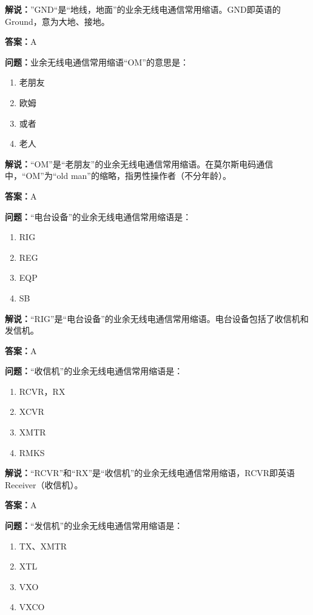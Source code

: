 \textbf{解说：}”GND“是“地线，地面”的业余无线电通信常用缩语。GND即英语的Ground，意为大地、接地。

\textbf{答案：}A

\textbf{问题：}业余无线电通信常用缩语“OM”的意思是：

\begin{enumerate}[label=\Alph*), leftmargin=3em]
	\item 老朋友
	\item 欧姆
	\item 或者
	\item 老人
\end{enumerate}

\textbf{解说：}“OM”是“老朋友”的业余无线电通信常用缩语。在莫尔斯电码通信中，“OM”为“old man”的缩略，指男性操作者（不分年龄）。

\textbf{答案：}A

\textbf{问题：}“电台设备”的业余无线电通信常用缩语是：

\begin{enumerate}[label=\Alph*), leftmargin=3em]
	\item RIG
	\item REG
	\item EQP
	\item SB
\end{enumerate}

\textbf{解说：}“RIG”是“电台设备”的业余无线电通信常用缩语。电台设备包括了收信机和发信机。

\textbf{答案：}A

\textbf{问题：}“收信机”的业余无线电通信常用缩语是：

\begin{enumerate}[label=\Alph*), leftmargin=3em]
	\item RCVR，RX
	\item XCVR
	\item XMTR
	\item RMKS
\end{enumerate}

\textbf{解说：}“RCVR”和“RX”是“收信机”的业余无线电通信常用缩语，RCVR即英语Receiver（收信机）。

\textbf{答案：}A

\textbf{问题：}“发信机”的业余无线电通信常用缩语是：

\begin{enumerate}[label=\Alph*), leftmargin=3em]
	\item TX、XMTR
	\item XTL
	\item VXO
	\item VXCO
\end{enumerate}

